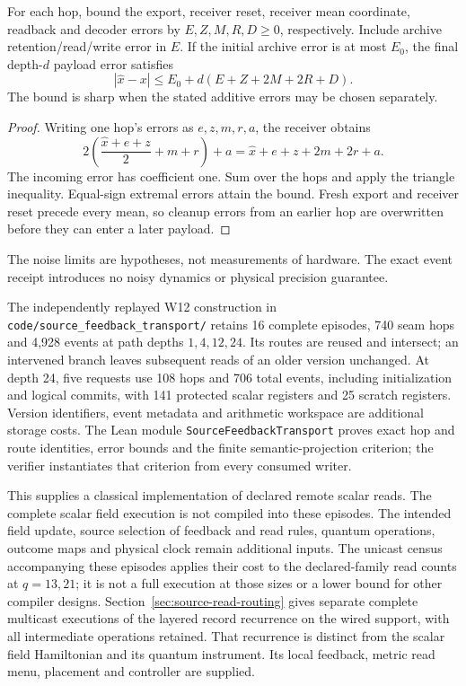 \begin{theorem}
\label{thm:source-feedback-error}
For each hop, bound the export, receiver reset, receiver mean coordinate,
readback and decoder errors by $E,Z,M,R,D\geq0$, respectively. Include
archive retention/read/write error in $E$. If the initial archive error is
at most $E_0$, the final depth-$d$ payload error satisfies
\[
 |\widehat x-x|\leq E_0+d(E+Z+2M+2R+D).
\]
The bound is sharp when the stated additive errors may be chosen separately.
\end{theorem}
\begin{proof}
Writing one hop's errors as $e,z,m,r,a$, the receiver obtains
\[
 2\left(\frac{\widehat x+e+z}{2}+m+r\right)+a
 =\widehat x+e+z+2m+2r+a.
\]
The incoming error has coefficient one. Sum over the hops and apply the
triangle inequality. Equal-sign extremal errors attain the bound.
Fresh export and receiver reset precede every mean, so cleanup errors from
an earlier hop are overwritten before they can enter a later payload.
\end{proof}
The noise limits are hypotheses, not measurements of hardware. The exact
event receipt introduces no noisy dynamics or physical precision guarantee.

The independently replayed W12 construction in
\texttt{code/source\_feedback\_transport/} retains 16 complete episodes,
740 seam hops and 4,928 events at path depths $1,4,12,24$. Its routes are
reused and intersect; an intervened branch leaves subsequent reads of an
older version unchanged. At depth 24, five requests use 108 hops and 706
total events, including initialization and logical commits, with 141
protected scalar registers and 25 scratch registers. Version identifiers,
event metadata and arithmetic workspace are additional storage costs.
The Lean module \texttt{SourceFeedbackTransport} proves exact hop and route
identities, error bounds and the finite semantic-projection criterion; the
verifier instantiates that criterion from every consumed writer.

This supplies a classical implementation of declared remote scalar reads.
The complete scalar field execution is not compiled into these episodes.
The intended field update, source selection of feedback and read rules,
quantum operations, outcome maps and physical clock remain additional inputs.
The unicast census accompanying these episodes applies their cost to the
declared-family read counts at $q=13,21$; it is not a full execution at
those sizes or a lower bound for other compiler designs.
Section~\ref{sec:source-read-routing} gives separate complete multicast
executions of the layered record recurrence on the wired support, with
all intermediate operations retained. That recurrence is distinct from
the scalar field Hamiltonian and its quantum instrument. Its local
feedback, metric read menu, placement and controller are supplied.
